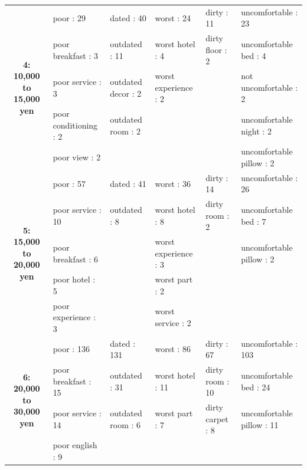 \documentclass[smallextended,natbib]{svjour3}       %
\begin{document}
\begin{landscape}
\begin{table}[p]
{\begin{tabular}{|c|l|l|l|l|l|}
           &
           \\ \hline
        \multirow{5}{*}{\textbf{4: 10,000 to 15,000 yen}} &
          poor : 29 &
          dated : 40 &
          worst : 24 &
          dirty : 11 &
          uncomfortable : 23 \\
         &
          poor breakfast : 3 &
          outdated : 11 &
          worst hotel : 4 &
          dirty floor : 2 &
          uncomfortable bed : 4 \\
         &
          poor service : 3 &
          outdated decor : 2 &
          worst experience : 2 &
           &
          not uncomfortable : 2 \\
         &
          poor conditioning : 2 &
          outdated room : 2 &
           &
           &
          uncomfortable night : 2 \\
         &
          poor view : 2 &
           &
           &
           &
          uncomfortable pillow : 2 \\ \hline
        \multirow{5}{*}{\textbf{5: 15,000 to 20,000 yen}} &
          poor : 57 &
          dated : 41 &
          worst : 36 &
          dirty : 14 &
          uncomfortable : 26 \\
         &
          poor service : 10 &
          outdated : 8 &
          worst hotel : 8 &
          dirty room : 2 &
          uncomfortable bed : 7 \\
         &
          poor breakfast : 6 &
           &
          worst experience : 3 &
           &
          uncomfortable pillow : 2 \\
         &
          poor hotel : 5 &
           &
          worst part : 2 &
           &
           \\
         &
          poor experience : 3 &
           &
          worst service : 2 &
           &
           \\ \hline
        \multirow{5}{*}{\textbf{6: 20,000 to 30,000 yen}} &
          poor : 136 &
          dated : 131 &
          worst : 86 &
          dirty : 67 &
          uncomfortable : 103 \\
         &
          poor breakfast : 15 &
          outdated : 31 &
          worst hotel : 11 &
          dirty room : 10 &
          uncomfortable bed : 24 \\
         &
          poor service : 14 &
          outdated room : 6 &
          worst part : 7 &
          dirty carpet : 8 &
          uncomfortable pillow : 11 \\
         &
          poor english : 9 &

\end{tabular}}
\end{table}
\end{landscape}
\end{document}

